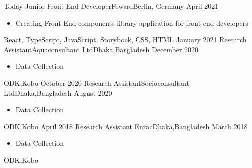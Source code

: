 \break
\break
{}
\begin{experiences}
  \experience
    {Today}   {Junior Front-End Developer}{Feward}{Berlin, Germany }
    {April 2021} {
                      \begin{itemize}
                        \item Creating Front End components library application for front end developers
                        
                      \end{itemize}
                    }
                    {React, TypeScript, JavaScript, Storybook, CSS, HTML}
  \emptySeparator
  \experience
    {January 2021} {Research Assistant}{Aquaconsultant Ltd}{Dhaka,Bangladesh}
    {December 2020}    {
                      \begin{itemize}
                        \item Data Collection                                                                
                      \end{itemize}
                    }
                    {ODK,Kobo}
  \emptySeparator
  \experience
    {October 2020}     {Research Assistant}{Socioconsultant Ltd}{Dhaka,Bangladesh}
    {August 2020}    {
                      \begin{itemize}
                        \item Data Collection 
                        
                      \end{itemize}
                    }
                    {ODK,Kobo}
  \emptySeparator
  \experience
  {April 2018}       {Research Assistant }{Enrac}{Dhaka,Bangladesh }
  {March 2018}      
                    {
                      \begin{itemize}
                        \item Data Collection 
                        
                      \end{itemize}
                    }
                    {ODK,Kobo}
  \emptySeparator

\end{experiences}
